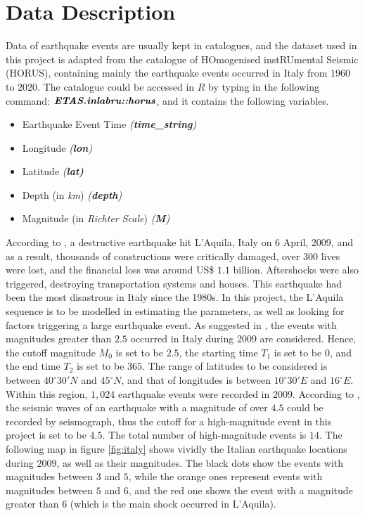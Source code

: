 \documentclass[11pt,twoside]{article}
\numberwithin{Theorem}{section}
\numberwithin{Definition}{section}
\numberwithin{Lemma}{section}
\numberwithin{Algorithm}{section}
\numberwithin{equation}{section}
\begin{document}
\section{Data Description}
\label{sec:data description}

Data of earthquake events are usually kept in catalogues, and the dataset used in this project is adapted from the catalogue of HOmogenised instRUmental Seismic (HORUS), containing mainly the earthquake events occurred in Italy from $1960$ to $2020$. The catalogue could be accessed in $\textit{R}$ by typing in the following command: $\textit{\textbf{ETAS.inlabru::horus}}$, and it contains the following variables.

\begin{itemize}
    \item Earthquake Event Time \textit{(\textbf{time\_string})}
    \item Longitude \textit{(\textbf{lon})}
    \item Latitude \textit{(\textbf{lat)}}
    \item Depth (in \textit{km}) \textit{(\textbf{depth})}
    \item Magnitude (in \textit{Richter Scale}) \textit{(\textbf{M})}

\end{itemize} 

According to \cite{internetgeographyLAquilaEarthquake}, a destructive earthquake hit L'Aquila, Italy on 6 April, 2009, and as a result, thousands of constructions were critically damaged, over $300$ lives were lost, and the financial loss was around US\$ $1.1$ billion. Aftershocks were also triggered, destroying transportation systems and houses. This earthquake had been the most disastrous in Italy since the 1980s. In this project, the L'Aquila sequence is to be modelled in estimating the parameters, as well as looking for factors triggering a large earthquake event. As suggested in \cite{edinburghseismicityhubTemporalModeld}, the events with magnitudes greater than $2.5$ occurred in Italy during $2009$ are considered. Hence, the cutoff magnitude $M_0$ is set to be $2.5$, the starting time $T_1$ is set to be $0$, and the end time $T_2$ is set to be $365$. The range of latitudes to be considered is between $40^\circ 30' N$ and $45^\circ N$, and that of longitudes is between $10^\circ 30' E$ and $16^\circ E$.  Within this region, $1,024$ earthquake events were recorded in $2009$. According to \cite{usgsSeverityEarthquake}, the seismic waves of an earthquake with a magnitude of over $4.5$ could be recorded by seismograph, thus the cutoff for a high-magnitude event in this project is set to be $4.5$. The total number of high-magnitude events is $14$. The following map in figure \ref{fig:italy} shows vividly the Italian earthquake locations during $2009$, as well as their magnitudes. The black dots show the events with magnitudes between $3$ and $5$, while the orange ones represent events with magnitudes between $5$ and $6$, and the red one shows the event with a magnitude greater than $6$ (which is the main shock occurred in L'Aquila). 
\end{document}
